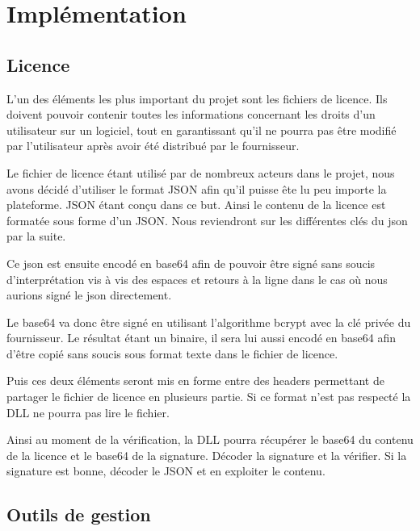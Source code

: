 \chapter{Implémentation}



\section{Licence}

L'un des éléments les plus important du projet sont les fichiers de licence.
\newline
Ils doivent pouvoir contenir toutes les informations concernant les droits d'un
utilisateur sur un logiciel, tout en garantissant qu'il ne pourra pas être 
modifié par l'utilisateur après avoir été distribué par le fournisseur.
\newline

Le fichier de licence étant utilisé par de nombreux acteurs dans le projet, 
nous avons décidé d'utiliser le format JSON afin qu'il puisse ête lu peu importe
la plateforme. JSON étant conçu dans ce but.
Ainsi le contenu de la licence est formatée sous forme d'un JSON. Nous reviendront
sur les différentes clés du json par la suite.
\newline

Ce json est ensuite encodé en base64 afin de pouvoir être signé sans soucis 
d'interprétation vis à vis des espaces et retours à la ligne dans le cas où nous 
aurions signé le json directement.
\newline

Le base64 va donc être signé en utilisant l'algorithme bcrypt avec la clé privée 
du fournisseur. Le résultat étant un binaire, il sera lui aussi encodé en base64 
afin d'être copié sans soucis sous format texte dans le fichier de licence. 
\newline

Puis ces deux éléments seront mis en forme entre des headers permettant de 
partager le fichier de licence en plusieurs partie. Si ce format n'est pas 
respecté la DLL ne pourra pas lire le fichier.
\newline

Ainsi au moment de la vérification, la DLL pourra récupérer le base64 du contenu 
de la licence et le base64 de la signature. Décoder la signature et la vérifier.
Si la signature est bonne, décoder le JSON et en exploiter le contenu.

\section{Outils de gestion}

